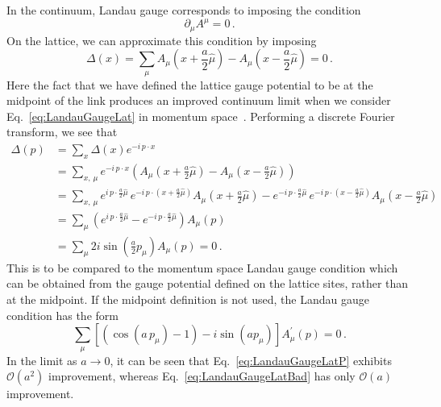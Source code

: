 In the continuum, Landau gauge corresponds to imposing the condition
\begin{equation}
\partial_\mu A^\mu = 0\, .
\label{eq:LandauGaugeCont}
\end{equation}
%
On the lattice, we can approximate this condition by imposing
\begin{equation}
\Delta(x) = \sum _ { \mu } A _ { \mu } \left( x + \frac{a}{2}\hat { \mu } \right) - A _ { \mu } \left( x-\frac{a}{2}\hat { \mu } \right) = 0\, .
\label{eq:LandauGaugeLat}
\end{equation}
Here the fact that we have defined the lattice gauge potential to be at the midpoint of the link produces an improved continuum limit when we consider Eq.~\ref{eq:LandauGaugeLat} in momentum space~\cite{Alles:1996ka}. Performing a discrete Fourier transform, we see that
%
\begin{align}
\Delta(p) &= \sum_x \Delta(x) e^{-i\,p\cdot x} \nonumber\\
&=\sum_{x,\,\mu} e^{-i\,p\cdot x} \left(A _ { \mu } \left( x + \frac{a}{2}\hat { \mu } \right) - A _ { \mu } \left( x-\frac{a}{2}\hat { \mu } \right)\right) \nonumber\\
&= \sum_{x,\,\mu} e^{i\,p\cdot\frac{a}{2}\hat{\mu} }\,e^{-i\,p\cdot\left(x+\frac{a}{2}\hat{\mu} \right)}A _ { \mu } \left( x + \frac{a}{2}\hat { \mu } \right) - e^{-i\,p\cdot\frac{a}{2}\hat{\mu} }\,e^{-i\,p\cdot\left(x-\frac{a}{2}\hat{\mu} \right)}A _ { \mu } \left( x - \frac{a}{2}\hat { \mu } \right) \nonumber\\
&= \sum_\mu \left(e^{i\,p\cdot\frac{a}{2}\hat{\mu} } - e^{-i\,p\cdot\frac{a}{2}\hat{\mu} }\right) A_\mu(p) \nonumber\\
&=\sum_\mu 2i\sin\left(\frac{a}{2} p_\mu\right)A_\mu(p) = 0\, .
\label{eq:LandauGaugeLatP}
\end{align}
%
This is to be compared to the momentum space Landau gauge condition which can be obtained from the gauge potential defined on the lattice sites, rather than at the midpoint. If the midpoint definition is not used, the Landau gauge condition has the form~\cite{Alles:1996ka}
%
\begin{equation}
\sum _ { \mu } \left[ \left( \cos (a\,p _ { \mu }) - 1 \right) - i \sin (ap _ { \mu }) \right] A _ { \mu } ^ { \prime } ( p ) = 0\, .
\label{eq:LandauGaugeLatBad}
\end{equation}
%
In the limit as $a\rightarrow 0$, it can be seen that Eq.~\ref{eq:LandauGaugeLatP} exhibits
$\mathcal{O}(a^2)$ improvement, whereas Eq.~\ref{eq:LandauGaugeLatBad} has only $\mathcal{O}(a)$ improvement.\\

